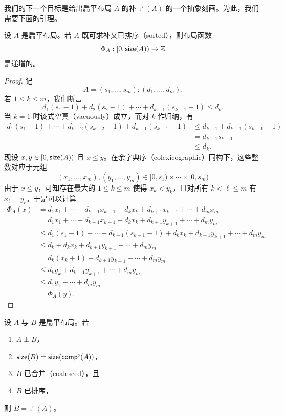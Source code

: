 \noindent 我们的下一个目标是给出扁平布局 $A$ 的补 $\comp^\flat(A)$ 的一个抽象刻画。为此，我们需要下面的引理。

\begin{lemma}\label{sortedcomplementablelayoutsareincreasing}
    设 $A$ 是扁平布局。若 $A$ 既可求补又已排序（sorted），则布局函数
    \[
    \Phi_A:[0,\mathsf{size}(A)) \to \mathbb{Z}
    \]
    是递增的。
\end{lemma}

\begin{proof}
    记
    \[
    A = (s_1,\dots,s_m):(d_1,\dots,d_m).
    \]
    若 $1 \leq k \leq m$，我们断言
    \[
    d_1(s_1-1) + d_2(s_2-1) + \cdots + d_{k-1}(s_{k-1}-1) \leq d_k.
    \]
    当 $k = 1$ 时该式空真（vacuously）成立，而对 $k$ 作归纳，有
    \begin{align*}
        d_1(s_1-1) + \cdots + d_{k-2}(s_{k-2}-1) + d_{k-1}(s_{k-1}-1) & \leq d_{k-1} + d_{k-1}(s_{k-1}-1)\\
        & = d_{k-1}s_{k-1}\\
        & \leq d_k.
    \end{align*}
    现设 $x,y \in [0,\mathsf{size}(A))$ 且 $x \leq y$。在余字典序（colexicographic）同构下，这些整数对应于元组
    \[(x_1,\dots,x_m),(y_1,\dots,y_m) \in [0,s_1) \times \cdots \times [0,s_m)\]
    由于 $x \leq y$，可知存在最大的 $1 \leq k \leq m$ 使得 $x_k<y_k$，且对所有 $k < \ell \leq m$ 有 $x_\ell = y_\ell$。于是可以计算
    \begin{align*}
    \Phi_A(x) & = d_1x_1 + \cdots + d_{k-1}x_{k-1} + d_k x_k + d_{k+1}x_{k+1} + \cdots + d_m x_m \\
    & = d_1x_1 + \cdots + d_{k-1}x_{k-1} + d_k x_k + d_{k+1}y_{k+1} + \cdots + d_m y_m\\
    & \leq d_1(s_1-1) + \cdots + d_{k-1}(s_{k-1}-1) + d_k x_k + d_{k+1}y_{k+1} + \cdots + d_m y_m\\
    & \leq d_k + d_kx_k + d_{k+1}y_{k+1} + \cdots + d_m y_m\\
    & = d_k(x_k+1) + d_{k+1}y_{k+1} + \cdots + d_m y_m\\
    & \leq d_ky_k +  d_{k+1}y_{k+1} + \cdots + d_m y_m\\
    & \leq d_1y_1 + \cdots + d_my_m\\
    & = \Phi_A(y).
    \end{align*}
\end{proof}

\begin{proposition}\label{characterizationofflatcomplement}
    设 $A$ 与 $B$ 是扁平布局。若
    \begin{enumerate}
        \item $A \perp B$，
        \item $\mathsf{size}(B) = \mathsf{size}(\mathsf{comp}^\flat(A))$，
        \item $B$ 已合并（coalesced），且
        \item $B$ 已排序，
    \end{enumerate}
    则 $B = \comp^\flat(A)$。
\end{proposition}




